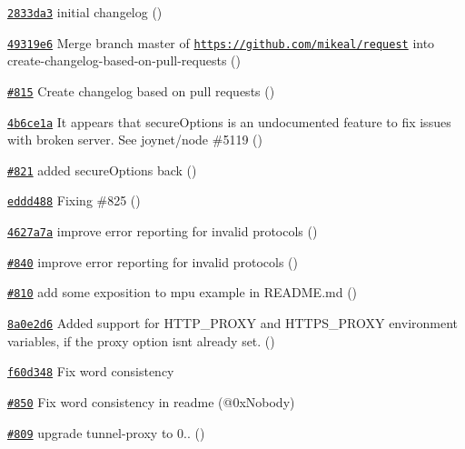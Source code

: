 \begin{DoxyItemize}
\item \href{https://github.com/mikeal/request/commit/2833da3c3c1c34f4130ad1ba470354fc32410691}{\tt 2833da3} initial changelog ()
\item \href{https://github.com/mikeal/request/commit/49319e6c09a8a169c95a8d282c900f9fecd50371}{\tt 49319e6} Merge branch \textquotesingle{}master\textquotesingle{} of \href{https://github.com/mikeal/request}{\tt https\+://github.\+com/mikeal/request} into create-\/changelog-\/based-\/on-\/pull-\/requests ()
\item \href{https://github.com/mikeal/request/pull/815}{\tt \#815} Create changelog based on pull requests ()
\item \href{https://github.com/mikeal/request/commit/4b6ce1ac0f79cb8fa633e281d3eb4c0cb61794e1}{\tt 4b6ce1a} It appears that secure\+Options is an undocumented feature to fix issues with broken server. See joynet/node \#5119 ()
\item \href{https://github.com/mikeal/request/pull/821}{\tt \#821} added secure\+Options back ()
\item \href{https://github.com/mikeal/request/commit/eddd4889fb1bc95c741749e79d9749aab3e103fc}{\tt eddd488} Fixing \#825 ()
\item \href{https://github.com/mikeal/request/commit/4627a7a14078494ded8c66c19c43efd07324cbd8}{\tt 4627a7a} improve error reporting for invalid protocols ()
\item \href{https://github.com/mikeal/request/pull/840}{\tt \#840} improve error reporting for invalid protocols ()
\item \href{https://github.com/mikeal/request/pull/810}{\tt \#810} add some exposition to mpu example in R\+E\+A\+D\+M\+E.\+md ()
\item \href{https://github.com/mikeal/request/commit/8a0e2d65351560858275c73505df12b537f4d001}{\tt 8a0e2d6} Added support for H\+T\+T\+P\+\_\+\+P\+R\+O\+X\+Y and H\+T\+T\+P\+S\+\_\+\+P\+R\+O\+X\+Y environment variables, if the proxy option isn\textquotesingle{}t already set. ()
\item \href{https://github.com/mikeal/request/commit/f60d348dc1840ee6d7b709efcc2b3cd1a03aef63}{\tt f60d348} Fix word consistency
\item \href{https://github.com/mikeal/request/pull/850}{\tt \#850} Fix word consistency in readme (@0x\+Nobody)
\item \href{https://github.com/mikeal/request/pull/809}{\tt \#809} upgrade tunnel-\/proxy to 0.. ()

\end{DoxyItemize}

